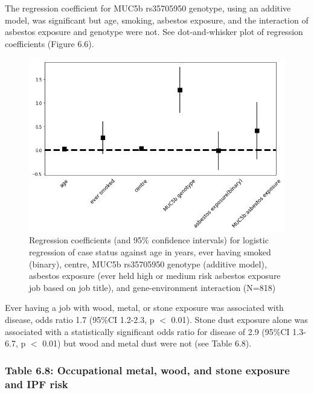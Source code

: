 The regression coefficient for MUC5b rs35705950 genotype, using an
additive model, was significant but age, smoking, asbestos exposure, and
the interaction of asbestos exposure and genotype were not. See
dot-and-whisker plot of regression coefficients (Figure 6.6).

\begin{figure}
\centering
\includegraphics{source/figures/regression_coefficients.png}
\caption{Regression coefficients (and 95\% confidence intervals) for
logistic regression of case status against age in years, ever having
smoked (binary), centre, MUC5b rs35705950 genotype (additive model),
asbestos exposure (ever held high or medium risk asbestos exposure job
based on job title), and gene-environment interaction (N=818)}
\end{figure}

Ever having a job with wood, metal, or stone exposure was associated
with disease, odds ratio 1.7 (95\%CI 1.2-2.3, p \ensuremath{<} 0.01).
Stone dust exposure alone was associated with a statistically
significant odds ratio for disease of 2.9 (95\%CI 1.3-6.7, p
\ensuremath{<} 0.01) but wood and metal dust were not (see Table 6.8).

\hypertarget{table-6.8-occupational-metal-wood-and-stone-exposure-and-ipf-risk}{%
\subsubsection{Table 6.8: Occupational metal, wood, and stone exposure
and IPF
risk}\label{table-6.8-occupational-metal-wood-and-stone-exposure-and-ipf-risk}}

